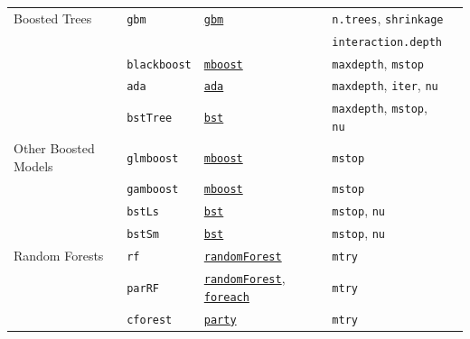 \documentclass[12pt]{article}
\newcommand{\code}[1]{\mbox{\footnotesize\color{darkblue}\texttt{#1}}}
\begin{document}
\begin{landscape}
\begin{longtable}{lllll}
     Boosted Trees &
         \code{gbm} & 
             {\tt \href{http://cran.r-project.org/web/packages/party/index.html}{gbm}}      & 
            \code{n.trees}, \code{shrinkage} &\\
           & & & \code{interaction.depth} & \\
      &
         \code{blackboost} & 
             {\tt \href{http://cran.r-project.org/web/packages/mboost/index.html}{mboost}}        & 
            \code{maxdepth}, \code{mstop} & \\
      &
         \code{ada} & 
            {\tt \href{http://cran.r-project.org/web/packages/ada/index.html}{ada}}       & 
            \code{maxdepth}, \code{iter}, \code{nu} & \\           
      &
         \code{bstTree} & 
            {\tt \href{http://cran.r-project.org/web/packages/bst/index.html}{bst}}       & 
            \code{maxdepth}, \code{mstop}, \code{nu} & \\                   
     
\rowcolor[rgb]{.95, .95, .95}               
      Other Boosted Models &
         \code{glmboost} & 
            {\tt \href{http://cran.r-project.org/web/packages/mboost/index.html}{mboost}}       &          
            \code{mstop} & \\   
\rowcolor[rgb]{.95, .95, .95}               
         &      
         \code{gamboost} & 
            {\tt \href{http://cran.r-project.org/web/packages/mboost/index.html}{mboost}}       &          
            \code{mstop} & \\   
\rowcolor[rgb]{.95, .95, .95}                 
      &
         \code{bstLs} & 
            {\tt \href{http://cran.r-project.org/web/packages/bst/index.html}{bst}}       & 
            \code{mstop}, \code{nu} & \\
\rowcolor[rgb]{.95, .95, .95}                 
       &
         \code{bstSm} & 
            {\tt \href{http://cran.r-project.org/web/packages/bst/index.html}{bst}}       & 
           \code{mstop}, \code{nu} & \\               

     Random Forests & 
         \code{rf} & 
            {\tt \href{http://cran.r-project.org/web/packages/randomForest/index.html}{randomForest}}        & 
            \code{mtry}  & \\
         & 
         \code{parRF} & 
             {\tt \href{http://cran.r-project.org/web/packages/randomForest/index.html}{randomForest}},  {\tt \href{http://cran.r-project.org/web/packages/foreach/index.html}{foreach}}        & 
            \code{mtry} & \\              
                  & 
         \code{cforest} & 
            {\tt \href{http://cran.r-project.org/web/packages/party/index.html}{party}}     & 
            \code{mtry} & \\     


\end{longtable}
\end{landscape}
\end{document}
